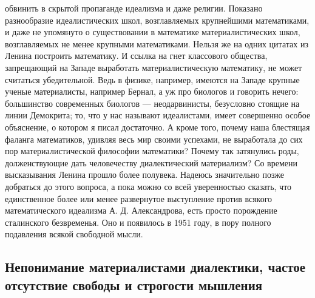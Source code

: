 обвинить в скрытой пропаганде идеализма и даже религии. Показано
разнообразие идеалистических школ, возглавляемых крупнейшими
математиками, и даже не упомянуто о существовании в математике
материалистических школ, возглавляемых не менее крупными математиками.
Нельзя же на одних цитатах из Ленина построить математику. И ссылка на
гнет классового общества, запрещающий на Западе выработать
материалистическую математику, не может считаться убедительной. Ведь в
физике, например, имеются на Западе крупные ученые материалисты,
например Бернал, а уж про биологов и говорить нечего: большинство
современных биологов --- неодарвинисты, безусловно стоящие на линии
Демокрита; то, что у нас называют идеалистами, имеет совершенно особое
объяснение, о котором я писал достаточно. А кроме того, почему наша
блестящая фаланга математиков, удивляя весь мир своими успехами, не
выработала до сих пор материалистической философии математики? Почему
так затянулись роды, долженствующие дать человечеству диалектический
материализм? Со времени высказывания Ленина прошло более полувека.
Надеюсь значительно позже добраться до этого вопроса, а пока можно со
всей уверенностью сказать, что единственное более или менее
развернутое выступление против всякого математического идеализма А. Д.
Александрова, есть просто порождение сталинского безвременья. Оно и
появилось в 1951 году, в пору полного подавления всякой свободной
мысли.

\subsection{Непонимание материалистами диалектики, частое отсутствие
свободы и строгости мышления}

